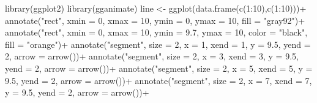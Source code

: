 \documentclass[
  letterpaper,
  DIV=11,
  numbers=noendperiod]{scrreprt}
\newenvironment{Shaded}{\begin{snugshade}}{\end{snugshade}}
\newcommand{\AttributeTok}[1]{\textcolor[rgb]{0.40,0.45,0.13}{#1}}
\newcommand{\DecValTok}[1]{\textcolor[rgb]{0.68,0.00,0.00}{#1}}
\newcommand{\FloatTok}[1]{\textcolor[rgb]{0.68,0.00,0.00}{#1}}
\newcommand{\FunctionTok}[1]{\textcolor[rgb]{0.28,0.35,0.67}{#1}}
\newcommand{\NormalTok}[1]{\textcolor[rgb]{0.00,0.23,0.31}{#1}}
\newcommand{\OtherTok}[1]{\textcolor[rgb]{0.00,0.23,0.31}{#1}}
\newcommand{\SpecialCharTok}[1]{\textcolor[rgb]{0.37,0.37,0.37}{#1}}
\newcommand{\StringTok}[1]{\textcolor[rgb]{0.13,0.47,0.30}{#1}}
\begin{document}
\begin{Shaded}
\begin{Highlighting}[]
\FunctionTok{library}\NormalTok{(ggplot2)}
\FunctionTok{library}\NormalTok{(gganimate)}
\NormalTok{line }\OtherTok{\textless{}{-}} \FunctionTok{ggplot}\NormalTok{(}\FunctionTok{data.frame}\NormalTok{(}\FunctionTok{c}\NormalTok{(}\DecValTok{1}\SpecialCharTok{:}\DecValTok{10}\NormalTok{),}\FunctionTok{c}\NormalTok{(}\DecValTok{1}\SpecialCharTok{:}\DecValTok{10}\NormalTok{)))}\SpecialCharTok{+}
  \FunctionTok{annotate}\NormalTok{(}\StringTok{"rect"}\NormalTok{, }\AttributeTok{xmin =} \DecValTok{0}\NormalTok{, }\AttributeTok{xmax =} \DecValTok{10}\NormalTok{, }\AttributeTok{ymin =} \DecValTok{0}\NormalTok{, }\AttributeTok{ymax =} \DecValTok{10}\NormalTok{, }\AttributeTok{fill =} \StringTok{"gray92"}\NormalTok{)}\SpecialCharTok{+}
  \FunctionTok{annotate}\NormalTok{(}\StringTok{"rect"}\NormalTok{, }\AttributeTok{xmin =} \DecValTok{0}\NormalTok{, }\AttributeTok{xmax =} \DecValTok{10}\NormalTok{, }\AttributeTok{ymin =} \FloatTok{9.7}\NormalTok{, }\AttributeTok{ymax =} \DecValTok{10}\NormalTok{, }\AttributeTok{color =} \StringTok{"black"}\NormalTok{, }\AttributeTok{fill =} \StringTok{"orange"}\NormalTok{)}\SpecialCharTok{+}
  \FunctionTok{annotate}\NormalTok{(}\StringTok{"segment"}\NormalTok{, }\AttributeTok{size =} \DecValTok{2}\NormalTok{, }\AttributeTok{x =} \DecValTok{1}\NormalTok{, }\AttributeTok{xend =} \DecValTok{1}\NormalTok{, }\AttributeTok{y =} \FloatTok{9.5}\NormalTok{, }\AttributeTok{yend =} \DecValTok{2}\NormalTok{, }\AttributeTok{arrow =} \FunctionTok{arrow}\NormalTok{())}\SpecialCharTok{+}
  \FunctionTok{annotate}\NormalTok{(}\StringTok{"segment"}\NormalTok{, }\AttributeTok{size =} \DecValTok{2}\NormalTok{, }\AttributeTok{x =} \DecValTok{3}\NormalTok{, }\AttributeTok{xend =} \DecValTok{3}\NormalTok{, }\AttributeTok{y =} \FloatTok{9.5}\NormalTok{, }\AttributeTok{yend =} \DecValTok{2}\NormalTok{, }\AttributeTok{arrow =} \FunctionTok{arrow}\NormalTok{())}\SpecialCharTok{+}
  \FunctionTok{annotate}\NormalTok{(}\StringTok{"segment"}\NormalTok{, }\AttributeTok{size =} \DecValTok{2}\NormalTok{, }\AttributeTok{x =} \DecValTok{5}\NormalTok{, }\AttributeTok{xend =} \DecValTok{5}\NormalTok{, }\AttributeTok{y =} \FloatTok{9.5}\NormalTok{, }\AttributeTok{yend =} \DecValTok{2}\NormalTok{, }\AttributeTok{arrow =} \FunctionTok{arrow}\NormalTok{())}\SpecialCharTok{+}
  \FunctionTok{annotate}\NormalTok{(}\StringTok{"segment"}\NormalTok{, }\AttributeTok{size =} \DecValTok{2}\NormalTok{, }\AttributeTok{x =} \DecValTok{7}\NormalTok{, }\AttributeTok{xend =} \DecValTok{7}\NormalTok{, }\AttributeTok{y =} \FloatTok{9.5}\NormalTok{, }\AttributeTok{yend =} \DecValTok{2}\NormalTok{, }\AttributeTok{arrow =} \FunctionTok{arrow}\NormalTok{())}\SpecialCharTok{+}

\end{Highlighting}
\end{Shaded}
\end{document}
